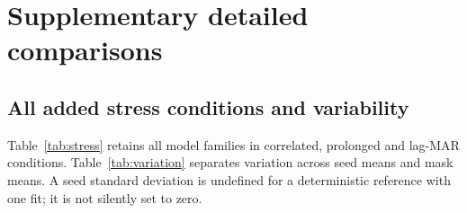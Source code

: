 \appendices
\section{Supplementary detailed comparisons}
\subsection{All added stress conditions and variability}
Table~\ref{tab:stress} retains all model families in correlated, prolonged and lag-MAR conditions. Table~\ref{tab:variation} separates variation across seed means and mask means. A seed standard deviation is undefined for a deterministic reference with one fit; it is not silently set to zero.
\begin{table}[!t]
\caption{Descriptive MASE under the three additional missingness mechanisms. ``Long'' denotes prolonged blocks; lag-MAR uses a nominal label with variable realized rate.}\label{tab:stress}
\centering\footnotesize
\FitTable{}
\end{table}
\begin{table}[!t]
\caption{Primary positive-loss MASE standard deviations across seed means and mask means. These two conditional summaries are not independent population variance components.}\label{tab:variation}
\centering\footnotesize
\FitTable{}
\end{table}

